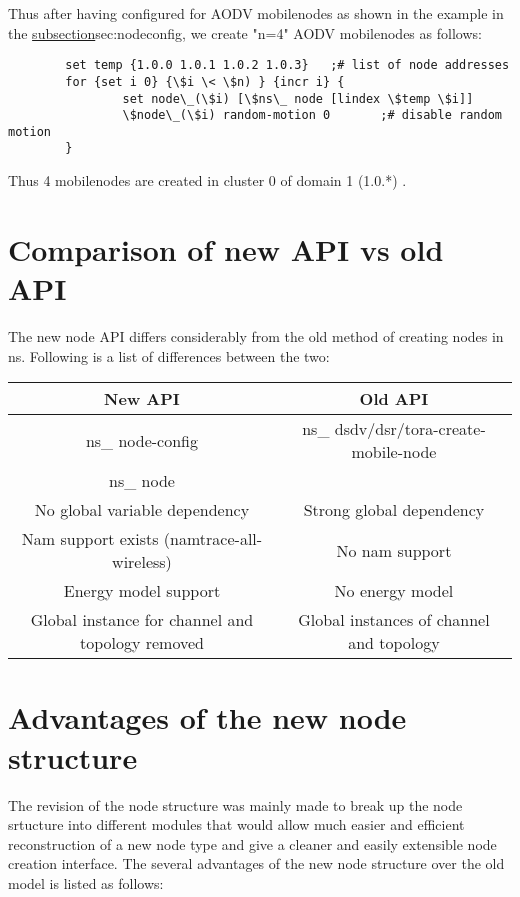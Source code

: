 Thus after having configured for AODV mobilenodes as shown in the example
in the \href{previous subsection}{subsection}{sec:nodeconfig}, we create
"n=4" AODV mobilenodes as follows:

\begin{verbatim}
        set temp {1.0.0 1.0.1 1.0.2 1.0.3}   ;# list of node addresses
        for {set i 0} {\$i \< \$n) } {incr i} {
                set node\_(\$i) [\$ns\_ node [lindex \$temp \$i]]
                \$node\_(\$i) random-motion 0       ;# disable random motion
        }    
\end{verbatim}

Thus 4 mobilenodes are created in cluster 0 of domain 1 (1.0.*) .
\clearpage

\section{Comparison of new API vs old API}
\label{sec:new-vs-old-api}

The new node API differs considerably from the old method of creating
nodes in ns. Following is a list of differences between the two:

\begin{table}[h]
\begin{center}
\begin{tabular}{|c|c|}\hline
{\bf New API} & {\bf Old API}\\\hline
ns\_ node-config & ns\_ dsdv/dsr/tora-create-mobile-node \\
ns\_ node & \\ \hline
No global variable dependency & Strong global dependency\\\hline
Nam support exists (namtrace-all-wireless) & No nam support\\\hline
Energy model support & No energy model\\\hline
Global instance for channel and topology removed & Global instances of
channel and topology\\\hline
\end{tabular}
\end{center}
\end{table}
\clearpage


\section{Advantages of the new node structure}
\label{sec:advan-newnode}

The revision of the node structure was mainly made to break up the node
srtucture into different modules that would allow much easier and
efficient reconstruction of a new node type and give a cleaner and easily
extensible node creation interface.
The several advantages of the new node structure over the old model is
listed as follows:

